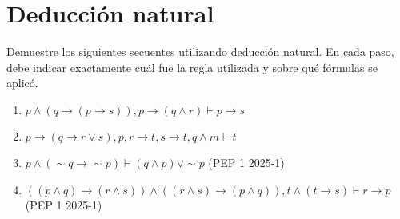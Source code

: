 \documentclass{article}
\begin{document}
\section{Deducción natural}
Demuestre los siguientes secuentes utilizando deducción natural. En cada paso,
debe indicar exactamente cuál fue la regla utilizada y sobre qué fórmulas se
aplicó.

\begin{enumerate}

  \item
        $p \land (q\rightarrow (p \rightarrow s)), p \rightarrow (q \land r) \vdash p \rightarrow s$

  \item
        $p \rightarrow (q \rightarrow r \vee s), p, r \rightarrow t, s \rightarrow t, q\land m \vdash t$

  \item $p \land (\sim q \rightarrow \sim p) \vdash (q \land p) \vee \sim p$
        \quad (PEP 1 2025-1)

  \item
        $((p \land q) \rightarrow (r \land s)) \land ((r \land s) \rightarrow (p \land q)), t \land (t \rightarrow s) \vdash r \rightarrow p$
        \quad (PEP 1 2025-1)



\end{enumerate}
\end{document}
